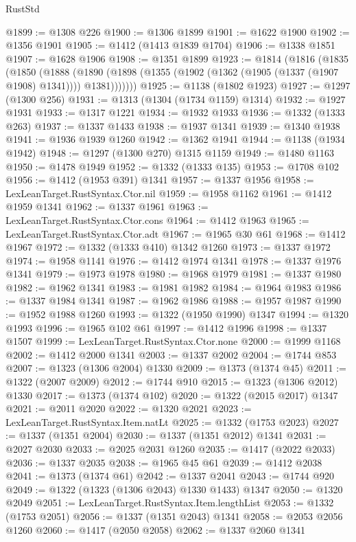 \begin{lexlean}{RustStd}
\begin{coremodule}
@1899 := @1308 @226
@1900 := @1306 @1899
@1901 := @1622 @1900
@1902 := @1356 @1901
@1905 := @1412 (@1413 @1839 @1704)
@1906 := @1338 @1851
@1907 := @1628 @1906
@1908 := @1351 @1899
@1923 := @1814
    (@1816
      (@1835
        (@1850
          (@1888
            (@1890 (@1898 (@1355 (@1902 (@1362 (@1905 (@1337 (@1907 @1908) @1341)))) @1381)))))))
@1925 := @1138 (@1802 @1923)
@1927 := @1297 (@1300 @256)
@1931 := @1313 (@1304 (@1734 @1159) @1314)
@1932 := @1927 @1931
@1933 := @1317 @1221
@1934 := @1932 @1933
@1936 := @1332 (@1333 @263)
@1937 := @1337 @1433
@1938 := @1937 @1341
@1939 := @1340 @1938
@1941 := @1936 @1939 @1260
@1942 := @1362 @1941
@1944 := @1138 (@1934 @1942)
@1948 := @1297 (@1300 @270) @1315 @1159
@1949 := @1480 @1163
@1950 := @1478 @1949
@1952 := @1332 (@1333 @135)
@1953 := @1708 @102
@1956 := @1412 (@1953 @391) @1341
@1957 := @1337 @1956
@1958 := LexLeanTarget.RustSyntax.Ctor.nil
@1959 := @1958 @1162
@1961 := @1412 @1959 @1341
@1962 := @1337 @1961
@1963 := LexLeanTarget.RustSyntax.Ctor.cons
@1964 := @1412 @1963
@1965 := LexLeanTarget.RustSyntax.Ctor.adt
@1967 := @1965 @30 @61
@1968 := @1412 @1967
@1972 := @1332 (@1333 @410) @1342 @1260
@1973 := @1337 @1972
@1974 := @1958 @1141
@1976 := @1412 @1974 @1341
@1978 := @1337 @1976 @1341
@1979 := @1973 @1978
@1980 := @1968 @1979
@1981 := @1337 @1980
@1982 := @1962 @1341
@1983 := @1981 @1982
@1984 := @1964 @1983
@1986 := @1337 @1984 @1341
@1987 := @1962 @1986
@1988 := @1957 @1987
@1990 := @1952 @1988 @1260
@1993 := @1322 (@1950 @1990) @1347
@1994 := @1320 @1993
@1996 := @1965 @102 @61
@1997 := @1412 @1996
@1998 := @1337 @1507
@1999 := LexLeanTarget.RustSyntax.Ctor.none
@2000 := @1999 @1168
@2002 := @1412 @2000 @1341
@2003 := @1337 @2002
@2004 := @1744 @853
@2007 := @1323 (@1306 @2004) @1330
@2009 := @1373 (@1374 @45)
@2011 := @1322 (@2007 @2009)
@2012 := @1744 @910
@2015 := @1323 (@1306 @2012) @1330
@2017 := @1373 (@1374 @102)
@2020 := @1322 (@2015 @2017) @1347
@2021 := @2011 @2020
@2022 := @1320 @2021
@2023 := LexLeanTarget.RustSyntax.Item.natLt
@2025 := @1332 (@1753 @2023)
@2027 := @1337 (@1351 @2004)
@2030 := @1337 (@1351 @2012) @1341
@2031 := @2027 @2030
@2033 := @2025 @2031 @1260
@2035 := @1417 (@2022 @2033)
@2036 := @1337 @2035
@2038 := @1965 @45 @61
@2039 := @1412 @2038
@2041 := @1373 (@1374 @61)
@2042 := @1337 @2041
@2043 := @1744 @920
@2049 := @1322 (@1323 (@1306 @2043) @1330 @1433) @1347
@2050 := @1320 @2049
@2051 := LexLeanTarget.RustSyntax.Item.lengthList
@2053 := @1332 (@1753 @2051)
@2056 := @1337 (@1351 @2043) @1341
@2058 := @2053 @2056 @1260
@2060 := @1417 (@2050 @2058)
@2062 := @1337 @2060 @1341

\end{coremodule}
\end{lexlean}
